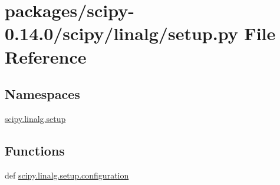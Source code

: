 \hypertarget{packages_2scipy-0_814_80_2scipy_2linalg_2setup_8py}{}\section{packages/scipy-\/0.14.0/scipy/linalg/setup.py File Reference}
\label{packages_2scipy-0_814_80_2scipy_2linalg_2setup_8py}
\subsection*{Namespaces}
\begin{DoxyCompactItemize}
\item 
 \hyperlink{namespacescipy_1_1linalg_1_1setup}{scipy.\+linalg.\+setup}
\end{DoxyCompactItemize}
\subsection*{Functions}
\begin{DoxyCompactItemize}
\item 
def \hyperlink{namespacescipy_1_1linalg_1_1setup_acdfa2839934a95801a2a72393c3cbb6d}{scipy.\+linalg.\+setup.\+configuration}
\end{DoxyCompactItemize}

